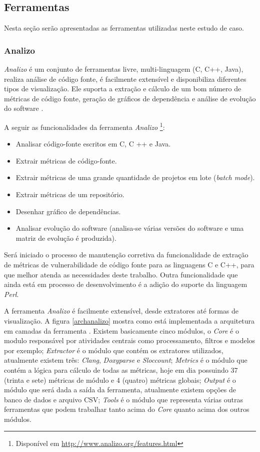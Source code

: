 \subsection{Ferramentas} \label{subsec:ferramentas}

Nesta seção serão apresentadas as ferramentas utilizadas neste estudo de caso.

\subsubsection{Analizo} \label{analizo}

\emph{Analizo} é um conjunto de ferramentas livre, multi-linguagem (C, C++, Java), realiza análise de código fonte, é facilmente 
extensível e disponibiliza diferentes tipos de visualização. Ele suporta a extração e cálculo de um bom número de métricas de 
código fonte, geração de gráficos de dependência e análise de evolução do software \cite{analizo}.

A seguir as funcionalidades da ferramenta \emph{Analizo} \footnote{Disponível em
\url{http://www.analizo.org/features.html}}:

\begin{itemize}
  \item Analisar código-fonte escritos em C, C ++ e Java.
  \item Extrair métricas de código-fonte.
  \item Extrair métricas de uma grande quantidade de projetos em lote (\textit{batch mode}).
  \item Extrair métricas de um repositório.
  \item Desenhar gráfico de dependências.
  \item Analisar evolução do software (analisa-se várias versões do software e uma matriz de evolução é produzida).
\end{itemize}

Será iniciado o processo de manutenção corretiva da funcionalidade de extração de métricas de vulnerabilidade de código fonte 
para as linguagens C e C++, para que melhor atenda as necessidades deste trabalho. Outra funcionalidade que ainda está em 
processo de desenvolvimento é a adição do suporte da linguagem \textit{Perl}.

A ferramenta \emph{Analizo} é facilmente extensível, desde extratores até formas de visualização. A figura \ref{archanalizo} mostra
como está implementada a arquitetura em camadas da ferramenta \cite{analizoartigo}. Existem basicamente cinco módulos, o 
\textit{Core} é o modulo responsável por atividades centrais como processamento, filtros e modelos por exemplo; 
\textit{Extractor} é o módulo que contém os extratores utilizados, atualmente existem três: \textit{Clang}, \textit{Doxyparse}
e \textit{Sloccount}; \textit{Metrics} é o módulo que contém a lógica para cálculo de todas as métricas, hoje em dia possuindo
37 (trinta e sete) métricas de módulo e 4 (quatro) métricas globais; \textit{Output} é o módulo que será dada a saída da 
ferramenta, atualmente existem opções de banco de dados e arquivo CSV; \textit{Tools} é o módulo que representa várias outras
ferramentas que podem trabalhar tanto acima do \textit{Core} quanto acima dos outros módulos.

